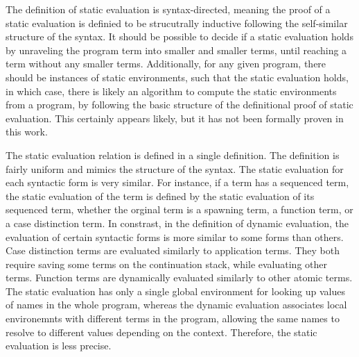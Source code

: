 \documentclass[letterpaper, 11pt]{report}
\begin{document}
The definition of static evaluation is syntax-directed, meaning the proof of a static evaluation
is definied to be strucutrally inductive following the self-similar structure of the syntax.
It should be possible to decide if a static evaluation holds
by unraveling the program term into smaller and smaller terms,
until reaching a term without any smaller terms.
Additionally, for any given program, there should be instances of static environments,
such that the static evaluation holds, in which case,
there is likely an algorithm to compute the static environments from a program,
by following the basic structure of the definitional proof of static evaluation.
This certainly appears likely, but it has not been formally proven in this work.

The static evaluation relation is defined in a single definition.
The definition is fairly uniform and mimics the structure of the syntax.
The static evaluation for each syntactic form is very similar.
For instance, if a term has a sequenced term,
the static evaluation of the term is defined
by the static evaluation of its sequenced term,
whether the orginal term is a spawning term, a function term, or a case distinction term.
In constrast, in the definition of dynamic evaluation,
the evaluation of certain syntactic forms is more similar to some forms than others.
Case distinction terms are evaluated similarly to application terms. They both require
saving some terms on the continuation stack, while evaluating other terms.
Function terms are dynamically evaluated similarly to other atomic terms.
The static evaluation has only a single global environment for
looking up values of names in the whole program, whereas the dynamic evaluation
associates local environemnts with different terms in the program, allowing the same
names to resolve to different values depending on the context. Therefore, the
static evaluation is less precise.
\end{document}
